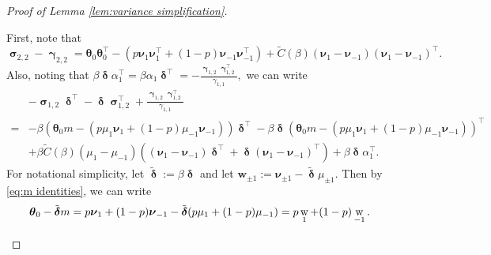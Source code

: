 \documentclass[preprint,reqno]{imsart}
\newcommand{\ttheta}{\boldsymbol{\theta}}
\DeclareMathOperator{\w}{{\mathnormal \mathbf{w}}}
\DeclareMathOperator{\ggamma}{\boldsymbol{\gamma}}
\DeclareMathOperator{\ssigma}{\boldsymbol{\sigma}}
\DeclareMathOperator{\ddelta}{\boldsymbol{\delta}}
\begin{document}
\begin{appendix}
\begin{proof}[Proof of Lemma \ref{lem:variance simplification}]
\begin{enumerate}[(a)]
First, note that $$\ssigma_{2,2} - \ggamma_{2,2} = \ttheta_0 \ttheta_0^\top - (p \boldsymbol{\nu}_1 \boldsymbol{\nu}_1^\top + (1-p) \boldsymbol{\nu}_{-1}\boldsymbol{\nu}_{-1}^\top) + \tilde{C}(\beta) (\boldsymbol{\nu}_1 - \boldsymbol{\nu}_{-1})(\boldsymbol{\nu}_1 - \boldsymbol{\nu}_{-1})^\top.$$
Also, noting that $\beta \ddelta \alpha_1^\top = \beta \alpha_1 \ddelta^\top =  - \frac{\ggamma_{1,2} \ggamma_{1,2}^\top}{\gamma_{1,1}},$ we can write
\begin{align*}
    & - \ssigma_{1,2} \ddelta^{\top} - \ddelta \ssigma_{1,2}^{\top} + \frac{\ggamma_{1,2} \ggamma_{1,2}^{\top}}{\gamma_{1,1}} \\
    = &-\beta (\ttheta_0 m - (p \mu_1 \boldsymbol{\nu}_1 + (1-p) \mu_{-1} \boldsymbol{\nu}_{-1})) \ddelta^\top - \beta \ddelta (\ttheta_0 m - (p \mu_1 \boldsymbol{\nu}_1 + (1-p) \mu_{-1} \boldsymbol{\nu}_{-1}))^\top \\
    & + \beta \tilde{C}(\beta) (\mu_1 - \mu_{-1}) \left((\boldsymbol{\nu}_1 - \boldsymbol{\nu}_{-1}) \ddelta^\top + \ddelta (\boldsymbol{\nu}_1 - \boldsymbol{\nu}_{-1})^\top \right) + \beta \ddelta \alpha_1^\top.
\end{align*}
For notational simplicity, let $\tilde{\ddelta} := \beta \ddelta$ and let $\mathbf{w}_{\pm 1} := \boldsymbol{\nu}_{\pm 1} - \tilde{\ddelta} \mu_{\pm 1}.$ Then by \eqref{eq:m identities}, we can write 
\begin{align}
    \ttheta_0 - \tilde{\ddelta} m &= p \boldsymbol{\nu}_1+(1-p) \boldsymbol{\nu}_{-1} - \tilde{\ddelta}(p \mu_1 + (1-p) \mu_{-1}) = p \w_1 +(1-p) \w_{-1}. \label{eq: theta0 - delta m}
\end{align}


\end{enumerate}
\end{proof}
\end{appendix}
\end{document}

